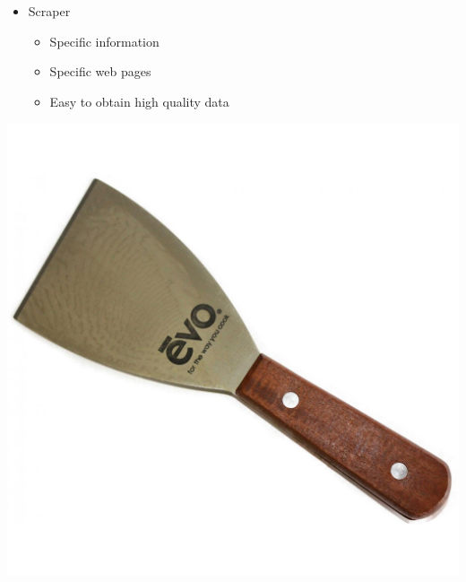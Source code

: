 \begin{frame}
\begin{minipage}[c]{0.6\textwidth}
\begin{itemize}
    \item Scraper
    \begin{itemize}
        \item Specific information
        \item Specific web pages
        \item Easy to obtain high quality data
    \end{itemize}
\end{itemize}
\end{minipage}
\hfill
\begin{minipage}[c]{0.3\textwidth}
\includegraphics[scale=0.04]{img/icons/scraper.jpg}
\end{minipage}

\end{frame}



